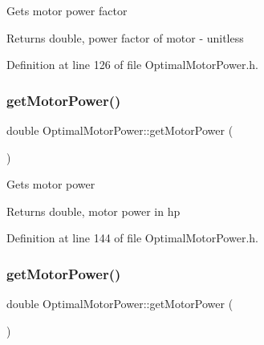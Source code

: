 Gets motor power factor

\begin{DoxyReturn}{Returns}
double, power factor of motor -\/ unitless 
\end{DoxyReturn}


Definition at line 126 of file Optimal\+Motor\+Power.\+h.

\mbox{\label{class_optimal_motor_power_af35a32c24df9198bcf0df5b8f6ea03a9}} 
\subsubsection{\texorpdfstring{get\+Motor\+Power()}{getMotorPower()}\hspace{0.1cm}{\footnotesize\ttfamily [1/3]}}
{\footnotesize\ttfamily double Optimal\+Motor\+Power\+::get\+Motor\+Power (\begin{DoxyParamCaption}{ }\end{DoxyParamCaption})\hspace{0.3cm}{\ttfamily [inline]}}

Gets motor power

\begin{DoxyReturn}{Returns}
double, motor power in hp 
\end{DoxyReturn}


Definition at line 144 of file Optimal\+Motor\+Power.\+h.

\mbox{\label{class_optimal_motor_power_af35a32c24df9198bcf0df5b8f6ea03a9}} 
\subsubsection{\texorpdfstring{get\+Motor\+Power()}{getMotorPower()}\hspace{0.1cm}{\footnotesize\ttfamily [2/3]}}
{\footnotesize\ttfamily double Optimal\+Motor\+Power\+::get\+Motor\+Power (\begin{DoxyParamCaption}{ }\end{DoxyParamCaption})\hspace{0.3cm}{\ttfamily [inline]}}

